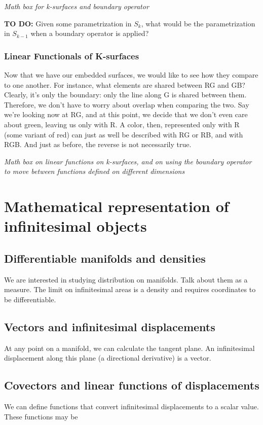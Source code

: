 \documentclass{book}
\begin{document}
\emph{Math box for k-surfaces and boundary operator}

\textbf{TO DO:} Given some parametrization in $S_{k}$, what would be the parametrization in $S_{k-1}$ when a boundary operator is applied?


\subsection{Linear Functionals of K-surfaces}
Now that we have our embedded surfaces, we would like to see how they compare to one another. For instance, what elements are shared between RG and GB? Clearly, it's only the boundary: only the line along G is shared between them. Therefore, we don't have to worry about overlap when comparing the two. 
Say we're looking now at RG, and at this point, we decide that we don't even care about green, leaving us only with R. A color, then, represented only with R (some variant of red) can just as well be described with RG or RB, and with RGB. And just as before, the reverse is not necessarily true. 

\emph{Math box on linear functions on k-surfaces, and on using the boundary operator to move between functions defined on different dimensions}




\chapter{Mathematical representation of infinitesimal objects}

\section{Differentiable manifolds and densities}
We are interested in studying distribution on manifolds. Talk about them as a measure. The limit on infinitesimal areas is a density and requires coordinates to be differentiable.

\section{Vectors and infinitesimal displacements}
At any point on a manifold, we can calculate the tangent plane. An infinitesimal displacement along this plane (a directional derivative) is a vector. 
\section{Covectors and linear functions of displacements}
We can define functions that convert infinitesimal displacements to a scalar value. These functions may be 
\end{document}
